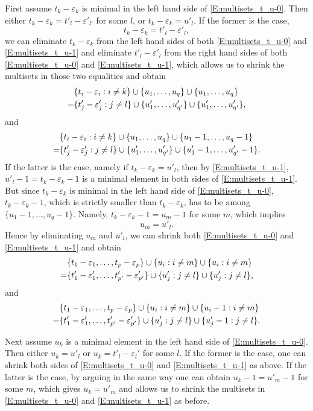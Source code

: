 \documentclass[11pt]{amsart}
\theoremstyle{plain}
\theoremstyle{definition}
\numberwithin{equation}{section}
\newcommand{\ep}{\varepsilon}
\newcommand{\ie}{\text{i.e.\ }}
\begin{document}
First assume $t_k-\ep_k$ is minimal in the left hand side of
\eqref{E:multisets_t_u-0}. Then either
$t_k-\ep_k=t'_l-\ep'_{l'}$ for some $l$, or $t_k-\ep_k=u'_l$. If the
former is the case, \ie
\[
t_k-\ep_k=t'_l-\ep'_l,
\]
we can eliminate $t_k-\ep_k$ from the left hand
sides of both \eqref{E:multisets_t_u-0} and \eqref{E:multisets_t_u-1}
and eliminate $t'_l-\ep'_l$ from the right hand
sides of both \eqref{E:multisets_t_u-0} and \eqref{E:multisets_t_u-1},
which allows us to shrink the multisets in those two equalities and obtain
\begin{align*}
&\{t_i-\ep_i: i\neq k\}\cup\{u_1,\dots,u_q\}\cup\{u_1,\dots,u_q\}\\
\notag=&\{t'_j-\ep'_j: j\neq l\}\cup\{u'_1,\dots,u'_{q'}\}\cup\{u'_1,\dots,u'_{q'}\},
\end{align*}
and
\begin{align*}
&\{t_i-\ep_i:i\neq k\}\cup\{u_1,\dots,u_q\}\cup\{u_1-1,\dots,u_q-1\}\\
\notag=&\{t'_j-\ep'_j: j\neq l\}\cup\{u'_1,\dots,u'_{q'}\}
\cup\{u'_1-1,\dots,u'_{q'}-1\}.
\end{align*}
If the latter is the case, namely if $t_k-\ep_k=u'_l$, then 
by \eqref{E:multisets_t_u-1}, 
$u'_l-1=t_k-\ep_k-1$ is a minimal element in both sides of
\eqref{E:multisets_t_u-1}. But since $t_k-\ep_k$ is minimal in the
left hand side of \eqref{E:multisets_t_u-0}, $t_k-\ep_k-1$, which is
strictly smaller than $t_k-\ep_k$, has to be among
$\{u_1-1,\dots,u_q-1\}$. Namely,
$t_k-\ep_k-1=u_m-1$ for some $m$, which implies 
\[
u_m=u'_l.
\] 
Hence by
eliminating $u_m$ and $u'_l$, we can shrink both \eqref{E:multisets_t_u-0} and
\eqref{E:multisets_t_u-1} and obtain
\begin{align*}
&\{t_1-\ep_1,\dots,t_p-\ep_p\}\cup\{u_i:i\neq m\}\cup\{u_i:i\neq m\}\\
\notag=&\{t'_1-\ep'_1,\dots,t'_{p'}-\ep'_{p'}\}\cup\{u'_j:j\neq
l\}\cup\{u'_j:j\neq l\},
\end{align*}
and
\begin{align*}
&\{t_1-\ep_1,\dots,t_p-\ep_p\}\cup\{u_i:i\neq m\}\cup\{u_i-1:i\neq m\}\\
\notag=&\{t'_1-\ep'_1,\dots,t'_{p'}-\ep'_{p'}\}\cup\{u'_j:j\neq
l\}\cup\{u'_j-1:j\neq l\}.
\end{align*}

Next assume $u_k$ is a minimal element in the left hand side of
\eqref{E:multisets_t_u-0}. Then either $u_k=u'_l$ or
$u_k=t'_l-\ep_l'$ for some $l$. If the former is the case, one can shrink both sides
of \eqref{E:multisets_t_u-0} and \eqref{E:multisets_t_u-1} as
above. If the latter is the case, by arguing in the same way one can
obtain $u_k-1=u'_m-1$ for some $m$, which gives $u_k=u'_m$ and allows
us to shrink the multisets in \eqref{E:multisets_t_u-0} and
\eqref{E:multisets_t_u-1} as before.
\end{document}

